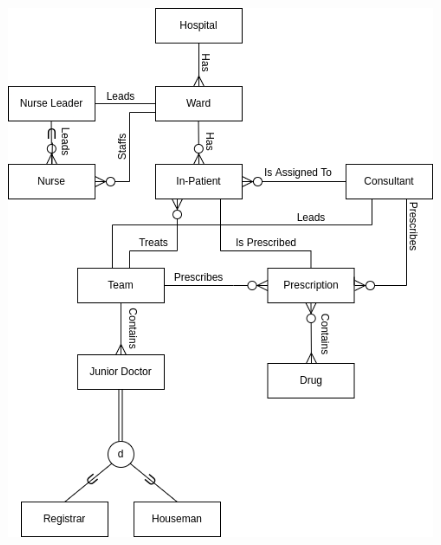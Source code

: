 \documentclass[11pt, english]{article}
\begin{document}
	\begin{center}
		\includegraphics[height=14cm,width=12cm]{CS990_IMG/ER.png}
	\end{center}

	\vspace{\fill}
\end{document}
